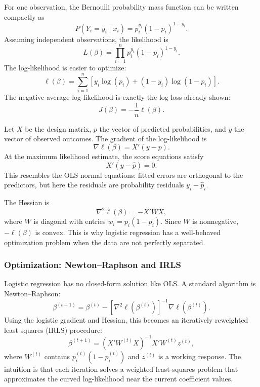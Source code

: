 \documentclass[12pt,openany]{book}
\begin{document}
For one observation, the Bernoulli probability mass function can be written compactly as
\[
P(Y_i=y_i\mid x_i)=p_i^{y_i}(1-p_i)^{1-y_i}.
\]
Assuming independent observations, the likelihood is
\[
L(\beta)=\prod_{i=1}^{n}p_i^{y_i}(1-p_i)^{1-y_i}.
\]
The log-likelihood is easier to optimize:
\[
\ell(\beta)=\sum_{i=1}^{n}\left[y_i\log(p_i)+(1-y_i)\log(1-p_i)\right].
\]
The negative average log-likelihood is exactly the log-loss already shown:
\[
J(\beta)=-\frac{1}{n}\ell(\beta).
\]

Let \(X\) be the design matrix, \(p\) the vector of predicted probabilities, and \(y\) the vector of observed outcomes. The gradient of the log-likelihood is
\[
\nabla \ell(\beta)=X'(y-p).
\]
At the maximum likelihood estimate, the score equations satisfy
\[
X'(y-\hat{p})=0.
\]
This resembles the OLS normal equations: fitted errors are orthogonal to the predictors, but here the residuals are probability residuals \(y_i-\hat{p}_i\).

The Hessian is
\[
\nabla^2\ell(\beta)=-X'WX,
\]
where \(W\) is diagonal with entries \(w_i=p_i(1-p_i)\). Since \(W\) is nonnegative, \(-\ell(\beta)\) is convex. This is why logistic regression has a well-behaved optimization problem when the data are not perfectly separated.

\subsubsection{Optimization: Newton--Raphson and IRLS}

Logistic regression has no closed-form solution like OLS. A standard algorithm is Newton--Raphson:
\[
\beta^{(t+1)}=\beta^{(t)}-\left[\nabla^2\ell(\beta^{(t)})\right]^{-1}\nabla\ell(\beta^{(t)}).
\]
Using the logistic gradient and Hessian, this becomes an iteratively reweighted least squares (IRLS) procedure:
\[
\beta^{(t+1)}=(X'W^{(t)}X)^{-1}X'W^{(t)}z^{(t)},
\]
where \(W^{(t)}\) contains \(p_i^{(t)}(1-p_i^{(t)})\) and \(z^{(t)}\) is a working response. The intuition is that each iteration solves a weighted least-squares problem that approximates the curved log-likelihood near the current coefficient values.


\begin{center}
\end{center}
\end{document}
